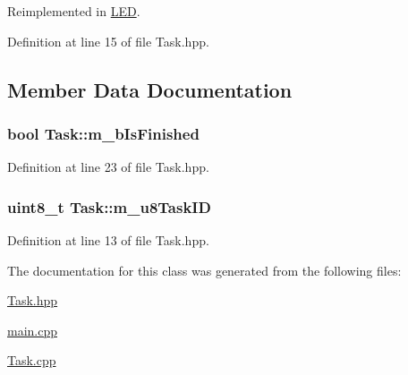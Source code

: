 Reimplemented in \hyperlink{class_l_e_d_a4fc6b6fffe8b434fc5263fce1c33ab6b}{L\+ED}.



Definition at line 15 of file Task.\+hpp.



\subsection{Member Data Documentation}
\subsubsection[{\texorpdfstring{m\+\_\+b\+Is\+Finished}{m_bIsFinished}}]{\setlength{\rightskip}{0pt plus 5cm}bool Task\+::m\+\_\+b\+Is\+Finished\hspace{0.3cm}{\ttfamily [protected]}}\hypertarget{class_task_a0adbc8e71d289d9e21bfe8b31b8bb86a}{}\label{class_task_a0adbc8e71d289d9e21bfe8b31b8bb86a}


Definition at line 23 of file Task.\+hpp.

\subsubsection[{\texorpdfstring{m\+\_\+u8\+Task\+ID}{m_u8TaskID}}]{\setlength{\rightskip}{0pt plus 5cm}uint8\+\_\+t Task\+::m\+\_\+u8\+Task\+ID}\hypertarget{class_task_aad8b8f71410b4593b6bee020cfd42174}{}\label{class_task_aad8b8f71410b4593b6bee020cfd42174}


Definition at line 13 of file Task.\+hpp.



The documentation for this class was generated from the following files\+:\begin{DoxyCompactItemize}
\item 
\hyperlink{_task_8hpp}{Task.\+hpp}\item 
\hyperlink{main_8cpp}{main.\+cpp}\item 
\hyperlink{_task_8cpp}{Task.\+cpp}\end{DoxyCompactItemize}
